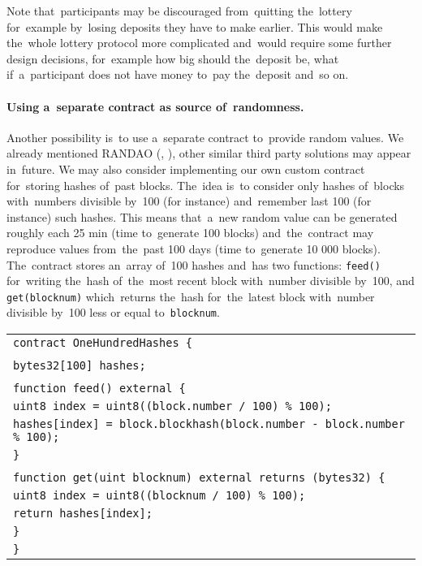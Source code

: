 \documentclass[a4paper]{article}
\begin{document}
    Note that~participants may be discouraged from~quitting the~lottery for~example by~losing deposits they have to
    make earlier. This would make the~whole lottery protocol more complicated and~would require some further design
    decisions, for~example how big should the~deposit be, what if~a~participant does not have money to~pay the~deposit
    and~so on.

    \paragraph{Using a~separate contract as source of~randomness.}
    Another possibility is~to use a~separate contract to~provide random values. We already mentioned RANDAO
    (\cite{RANDAO}, \cite{RANDAO2}), other similar third party solutions may appear in~future.
    We may also consider implementing our own custom contract for~storing hashes of~past blocks.
    The~idea is~to consider only hashes of~blocks with~numbers divisible by~100 (for instance) and~remember last 100
    (for instance) such hashes. This means that~a~new random value can be generated roughly each 25 min
    (time to~generate 100 blocks) and~the~contract may reproduce values from~the~past 100 days
    (time to~generate 10 000 blocks). The~contract stores an~array of~100 hashes and~has two functions:
    \texttt{feed()} for~writing the~hash of~the~most recent block with~number divisible by~100, and
    \texttt{get(blocknum)} which~returns the~hash for~the~latest block with~number divisible by~100 less or
    equal to~\texttt{blocknum}.

    \label{sec:hundred}

    \begin{tabular}{l}
        \texttt{contract OneHundredHashes \{}\\
        \\
	    \qquad \texttt{bytes32[100] hashes;}\\
        \\
	    \qquad\texttt{function feed() external \{}\\
    	\qquad\qquad \texttt{uint8 index = uint8((block.number / 100) \% 100);}\\
    	\qquad\qquad \texttt{hashes[index] = block.blockhash(block.number - block.number \% 100);}\\
	    \qquad\texttt{\}}\\
        \\
	    \qquad \texttt{function get(uint blocknum) external returns (bytes32) \{}\\
        \qquad\qquad \texttt{uint8 index = uint8((blocknum / 100) \% 100);}\\
    	\qquad\qquad \texttt{return hashes[index];}\\
	    \qquad\texttt{\}}\\
    \texttt{\}}
    \end{tabular}
\end{document}
